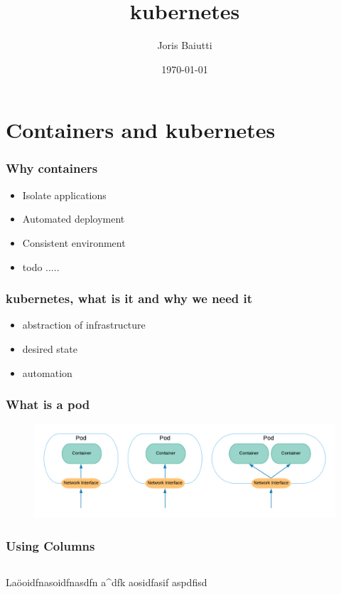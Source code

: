 \documentclass{beamer}
\title{kubernetes}
\author{Joris Baiutti}
\institute{Berner Fachhochschule}
\date{\today}
\begin{document}
\begin{frame}
\titlepage
\end{frame}

\section{Containers and kubernetes}

\begin{frame}
\frametitle{Why containers}
\begin{itemize}
    \item Isolate applications
    \item Automated deployment
    \item Consistent environment 
    \item todo .....
\end{itemize}
\end{frame}

\begin{frame}
\frametitle{kubernetes, what is it and why we need it}
    \begin{itemize}
        \item abstraction of infrastructure
        \item desired state
        \item automation
    \end{itemize}
\end{frame}

\begin{frame}
\frametitle{What is a pod}
    \begin{figure}
        \includegraphics[width=\linewidth]{images/Pods.png}
    \end{figure}
\end{frame}

\begin{frame}
    \frametitle{Using Columns}
    \begin{columns}
    Laöoidfnasoidfnasdfn 
    a^dfk
    aosidfasif aspdfisd
    \end{columns}
\end{frame}
\end{document}
